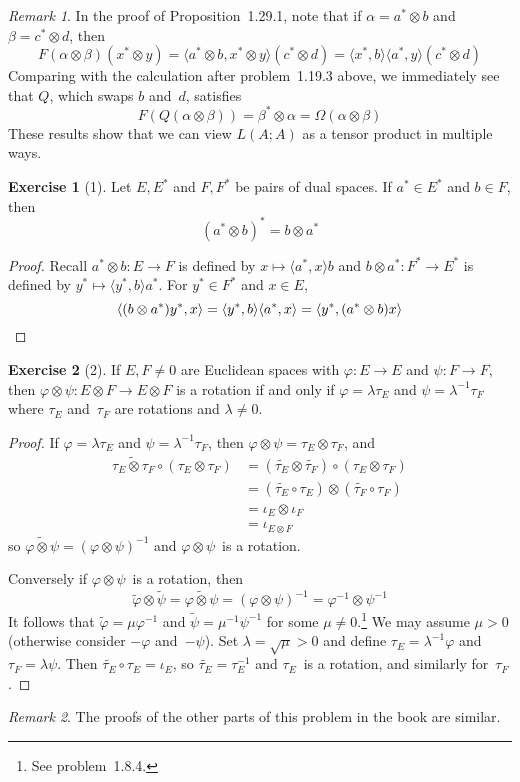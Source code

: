 \documentclass[letterpaper,12pt]{article}
\newcommand{\after}{\circ}
\newcommand{\tprod}{\otimes}
\newcommand{\sprod}[2]{\langle#1,#2\rangle}
\newcommand{\adj}[1]{\widetilde{#1}}
\theoremstyle{definition}
\newtheorem*{exer}{Exercise}
\theoremstyle{remark}
\newtheorem*{rmk}{Remark}
\begin{document}
\begin{rmk}
In the proof of Proposition~1.29.1, note that if \(\alpha=a^*\tprod b\) and \(\beta=c^*\tprod d\), then
\[F(\alpha\tprod\beta)(x^*\tprod y)=\sprod{a^*\tprod b}{x^*\tprod y}(c^*\tprod d)=\sprod{x^*}{b}\sprod{a^*}{y}(c^*\tprod d)\]
Comparing with the calculation after problem~1.19.3 above, we immediately see that \(Q\), which swaps \(b\) and~\(d\), satisfies
\[F(Q(\alpha\tprod\beta))=\beta^*\tprod\alpha=\Omega(\alpha\tprod\beta)\]
These results show that we can view \(L(A;A)\) as a tensor product in multiple ways.
\end{rmk}

\begin{exer}[1]
Let \(E,E^*\) and \(F,F^*\) be pairs of dual spaces. If \(a^*\in E^*\) and \(b\in F\), then
\[(a^*\tprod b)^*=b\tprod a^*\]
\end{exer}
\begin{proof}
Recall \(a^*\tprod b:E\to F\) is defined by \(x\mapsto\sprod{a^*}{x}b\) and \(b\tprod a^*:F^*\to E^*\) is defined by \(y^*\mapsto\sprod{y^*}{b}a^*\). For \(y^*\in F^*\) and \(x\in E\),
\[\sprod{(b\tprod a^*)y^*}{x}=\sprod{y^*}{b}\sprod{a^*}{x}=\sprod{y^*}{(a^*\tprod b)x}\qedhere\]
\end{proof}

\begin{exer}[2]
If \(E,F\ne 0\) are Euclidean spaces with \(\varphi:E\to E\) and \(\psi:F\to F\), then \(\varphi\tprod\psi:E\tprod F\to E\tprod F\) is a rotation if and only if \(\varphi=\lambda\tau_E\) and \(\psi=\lambda^{-1}\tau_F\) where \(\tau_E\) and~\(\tau_F\) are rotations and \(\lambda\ne 0\).
\end{exer}
\begin{proof}
If \(\varphi=\lambda\tau_E\) and \(\psi=\lambda^{-1}\tau_F\), then \(\varphi\tprod\psi=\tau_E\tprod\tau_F\), and
\begin{align*}
\adj{\tau_E\tprod\tau_F}\after(\tau_E\tprod\tau_F)&=(\adj{\tau_E}\tprod\adj{\tau_F})\after(\tau_E\tprod\tau_F)\\
	&=(\adj{\tau_E}\after\tau_E)\tprod(\adj{\tau_F}\after\tau_F)\\
	&=\iota_E\tprod\iota_F\\
	&=\iota_{E\tprod F}
\end{align*}
so \(\adj{\varphi\tprod\psi}=(\varphi\tprod\psi)^{-1}\) and \(\varphi\tprod\psi\)~is a rotation.

Conversely if \(\varphi\tprod\psi\)~is a rotation, then
\[\adj{\varphi}\tprod\adj{\psi}=\adj{\varphi\tprod\psi}=(\varphi\tprod\psi)^{-1}=\varphi^{-1}\tprod\psi^{-1}\]
It follows that \(\adj{\varphi}=\mu\varphi^{-1}\) and \(\adj{\psi}=\mu^{-1}\psi^{-1}\) for some \(\mu\ne 0\).\footnote{See problem~1.8.4.} We may assume \(\mu>0\) (otherwise consider \(-\varphi\) and~\(-\psi\)). Set \(\lambda=\sqrt{\mu}>0\) and define \(\tau_E=\lambda^{-1}\varphi\) and \(\tau_F=\lambda\psi\). Then \(\adj{\tau_E}\after\tau_E=\iota_E\), so \(\adj{\tau_E}=\tau_E^{-1}\) and \(\tau_E\)~is a rotation, and similarly for~\(\tau_F\).
\end{proof}
\begin{rmk}
The proofs of the other parts of this problem in the book are similar.
\end{rmk}
\end{document}
